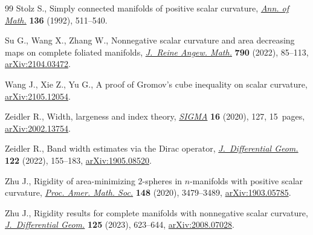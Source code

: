 \documentclass[10pt,a4paper]{amsart}
\numberwithin{equation}{section}
\begin{document}
\begin{thebibliography}{99}
Stolz S., Simply connected manifolds of positive scalar curvature, \href{https://doi.org/10.2307/2946598}{\textit{Ann.
  of Math.}} \textbf{136} (1992), 511--540.

Su G., Wang X., Zhang W., Nonnegative scalar curvature and area decreasing maps
  on complete foliated manifolds, \href{https://doi.org/10.1515/crelle-2022-0038}{\textit{J.~Reine Angew. Math.}} \textbf{790}
  (2022), 85--113, \href{https://arxiv.org/abs/2104.03472}{arXiv:2104.03472}.

Wang J., Xie Z., Yu G., A proof of {G}romov's cube inequality on scalar
  curvature, \href{https://arxiv.org/abs/2105.12054}{arXiv:2105.12054}.

Zeidler R., Width, largeness and index theory, \href{https://doi.org/10.3842/SIGMA.2020.127}{\textit{SIGMA}} \textbf{16}
  (2020), 127, 15~pages, \href{https://arxiv.org/abs/2002.13754}{arXiv:2002.13754}.

Zeidler R., Band width estimates via the {D}irac operator,
  \href{https://doi.org/10.4310/jdg/1668186790}{\textit{J.~Differential Geom.}} \textbf{122} (2022), 155--183,
  \href{https://arxiv.org/abs/1905.08520}{arXiv:1905.08520}.

Zhu J., Rigidity of area-minimizing {$2$}-spheres in {$n$}-manifolds with
  positive scalar curvature, \href{https://doi.org/10.1090/proc/15033}{\textit{Proc. Amer. Math. Soc.}} \textbf{148}
  (2020), 3479--3489, \href{https://arxiv.org/abs/1903.05785}{arXiv:1903.05785}.

Zhu J., Rigidity results for complete manifolds with nonnegative scalar
  curvature, \href{https://doi.org/10.4310/jdg/1701804153}{\textit{J.~Differential Geom.}} \textbf{125} (2023), 623--644,
  \href{https://arxiv.org/abs/2008.07028}{arXiv:2008.07028}.

\end{thebibliography}
\end{document}
